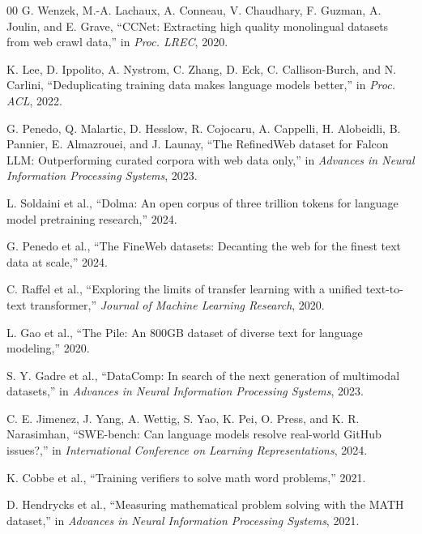 \documentclass[conference]{IEEEtran}
\begin{document}
\begin{thebibliography}{00}
G. Wenzek, M.-A. Lachaux, A. Conneau, V. Chaudhary, F. Guzman,
A. Joulin, and E. Grave, ``CCNet: Extracting high quality monolingual datasets
from web crawl data,'' in \emph{Proc. LREC}, 2020.

K. Lee, D. Ippolito, A. Nystrom, C. Zhang, D. Eck, C. Callison-Burch,
and N. Carlini, ``Deduplicating training data makes language models better,''
in \emph{Proc. ACL}, 2022.

G. Penedo, Q. Malartic, D. Hesslow, R. Cojocaru, A. Cappelli,
H. Alobeidli, B. Pannier, E. Almazrouei, and J. Launay, ``The RefinedWeb
dataset for Falcon LLM: Outperforming curated corpora with web data only,''
in \emph{Advances in Neural Information Processing Systems}, 2023.

L. Soldaini et al., ``Dolma: An open corpus of three trillion tokens for
language model pretraining research,'' 2024.

G. Penedo et al., ``The FineWeb datasets: Decanting the web for the finest text
data at scale,'' 2024.

C. Raffel et al., ``Exploring the limits of transfer learning with a unified
text-to-text transformer,'' \emph{Journal of Machine Learning Research}, 2020.

L. Gao et al., ``The Pile: An 800GB dataset of diverse text for language
modeling,'' 2020.

S. Y. Gadre et al., ``DataComp: In search of the next generation of multimodal
datasets,'' in \emph{Advances in Neural Information Processing Systems}, 2023.

C. E. Jimenez, J. Yang, A. Wettig, S. Yao, K. Pei, O. Press, and
K. R. Narasimhan, ``SWE-bench: Can language models resolve real-world GitHub
issues?,'' in \emph{International Conference on Learning Representations}, 2024.

K. Cobbe et al., ``Training verifiers to solve math word problems,'' 2021.

D. Hendrycks et al., ``Measuring mathematical problem solving with the MATH
dataset,'' in \emph{Advances in Neural Information Processing Systems}, 2021.
\end{thebibliography}
\end{document}
